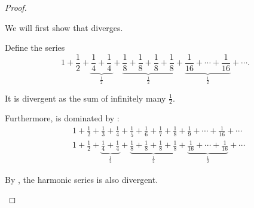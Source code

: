 \begin{proof}\mbox{}
  \begin{description}
     We will first show that  diverges.

    Define the series
    \begin{equation}\label{def:harmonic_progression/powers_of_two}
      1 + \frac 1 2 + \underbrace{\frac 1 4 + \frac 1 4}_{\tfrac 1 2} + \underbrace{\frac 1 8 + \frac 1 8 + \frac 1 8 + \frac 1 8}_{\tfrac 1 2} + \underbrace{\frac 1 {16} + \cdots + \frac 1 {16}}_{\tfrac 1 2} + \cdots.
    \end{equation}

    It is divergent as the sum of infinitely many \( \frac 1 2 \).

    Furthermore,  is dominated by :
    \begin{align*}
      &1 + \frac 1 2 + \frac 1 3 + \frac 1 4 + \frac 1 5 + \frac 1 6 + \frac 1 7 + \frac 1 8 + \frac 1 9 + \cdots + \frac 1 {16} + \cdots
      \\
      &1 + \frac 1 2 + \underbrace{\frac 1 4 + \frac 1 4}_{\tfrac 1 2} + \underbrace{\frac 1 8 + \frac 1 8 + \frac 1 8 + \frac 1 8}_{\tfrac 1 2} + \underbrace{\frac 1 {16} + \cdots + \frac 1 {16}}_{\tfrac 1 2} + \cdots
    \end{align*}

    By , the harmonic series  is also divergent.
  \end{description}
\end{proof}
